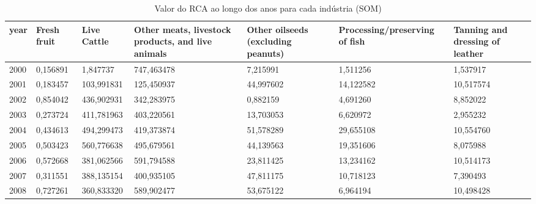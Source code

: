 \begin{table}
\centering
\caption{Valor do RCA ao longo dos anos para cada indústria (SOM)}
\begin{tabular}{p{1cm}p{2cm}p{2cm}p{2cm}p{2cm}p{2cm}p{2cm}}
\toprule
 year &  Fresh fruit &  Live Cattle &  Other meats, livestock products, and live animals &  Other oilseeds (excluding peanuts) &  Processing/preserving of fish &  Tanning and dressing of leather \\
\midrule
 2000 &     0,156891 &     1,847737 &                                         747,463478 &                            7,215991 &                       1,511256 &                         1,537917 \\
 2001 &     0,183457 &   103,991831 &                                         125,450937 &                           44,997602 &                      14,122582 &                        10,517574 \\
 2002 &     0,854042 &   436,902931 &                                         342,283975 &                            0,882159 &                       4,691260 &                         8,852022 \\
 2003 &     0,273724 &   411,781963 &                                         403,220561 &                           13,703053 &                       6,620972 &                         2,955232 \\
 2004 &     0,434613 &   494,299473 &                                         419,373874 &                           51,578289 &                      29,655108 &                        10,554760 \\
 2005 &     0,503423 &   560,776638 &                                         495,679561 &                           44,139563 &                      19,351606 &                         8,075988 \\
 2006 &     0,572668 &   381,062566 &                                         591,794588 &                           23,811425 &                      13,234162 &                        10,514173 \\
 2007 &     0,311551 &   388,135154 &                                         400,935105 &                           47,811175 &                      10,718123 &                         7,390493 \\
 2008 &     0,727261 &   360,833320 &                                         589,902477 &                           53,675122 &                       6,964194 &                        10,498428 \\

\end{tabular}
\end{table}
